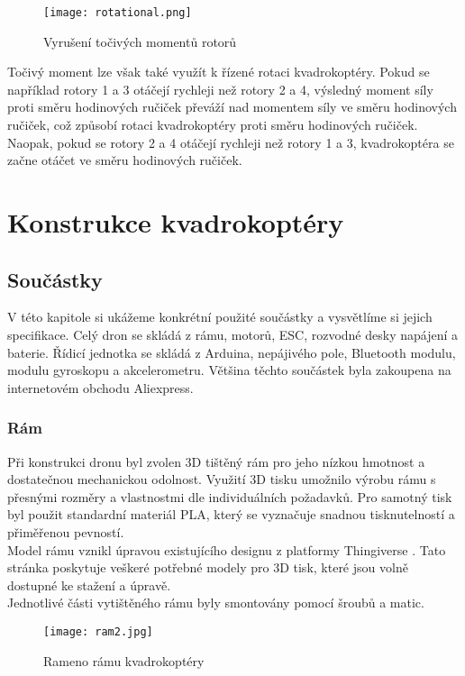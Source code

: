 \documentclass[12pt]{report}
\begin{document}
\begin{figure}[H]
	\centering
	\texttt{[image: rotational.png]}
	\caption{Vyrušení točivých momentů rotorů \cite{nasa}}
	\label{fig:rotational.png}
\end{figure}

Točivý moment lze však také využít k řízené rotaci kvadrokoptéry. Pokud se například rotory 1 a 3 otáčejí rychleji než rotory 2 a 4, výsledný moment síly proti směru hodinových ručiček převáží nad momentem síly ve směru hodinových ručiček, což způsobí rotaci kvadrokoptéry proti směru hodinových ručiček. Naopak, pokud se rotory 2 a 4 otáčejí rychleji než rotory 1 a 3, kvadrokoptéra se začne otáčet ve směru hodinových ručiček. \cite{nasa} \cite{ca}
\part{Konstrukce kvadrokoptéry} %

\chapter[Součástky]{Součástky}
V této kapitole si ukážeme konkrétní použité součástky a vysvětlíme si jejich specifikace. Celý dron se skládá z rámu, motorů, ESC, rozvodné desky napájení a baterie. Řídicí jednotka se skládá z Arduina, nepájivého pole, Bluetooth modulu, modulu gyroskopu a akcelerometru. Většina těchto součástek byla zakoupena na internetovém obchodu Aliexpress.

\section[Rám]{Rám}
Při konstrukci dronu byl zvolen 3D tištěný rám pro jeho nízkou hmotnost a dostatečnou mechanickou odolnost. Využití 3D tisku umožnilo výrobu rámu s přesnými rozměry a vlastnostmi dle individuálních požadavků. Pro samotný tisk byl použit standardní materiál PLA, který se vyznačuje snadnou tisknutelností a přiměřenou pevností.\\
Model rámu vznikl úpravou existujícího designu z platformy Thingiverse \cite{ram}. Tato stránka poskytuje veškeré potřebné modely pro 3D tisk, které jsou volně dostupné ke stažení a úpravě.\\
Jednotlivé části vytištěného rámu byly smontovány pomocí šroubů a matic.
\begin{figure}[H]
	\centering
	\texttt{[image: ram2.jpg]}
	\caption{Rameno rámu kvadrokoptéry}
	\label{fig:ram2.jpg}
\end{figure}
\end{document}
